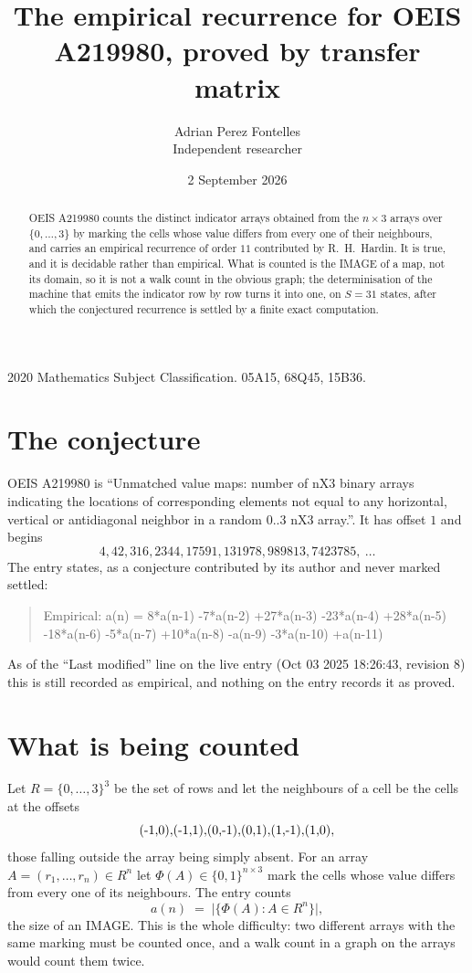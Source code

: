 \documentclass[11pt,a4paper]{article}
\title{The empirical recurrence for OEIS A219980, proved by transfer matrix}
\author{Adrian Perez Fontelles\\ \small Independent researcher}
\date{2 September 2026}
\theoremstyle{plain}
\theoremstyle{definition}
\begin{document}
\maketitle

\begin{abstract}
OEIS A219980 counts the distinct indicator arrays obtained from the $n\times3$ arrays over
$\{0,\dots,3\}$ by marking the cells whose value differs from every one of their neighbours, and carries an
empirical recurrence of order $11$ contributed by R.~H.~Hardin. It is true, and it is
decidable rather than empirical. What is counted is the IMAGE of a map, not its domain, so it
is not a walk count in the obvious graph; the determinisation of the machine that emits the
indicator row by row turns it into one, on $S=31$ states, after which the conjectured
recurrence is settled by a finite exact computation.
\end{abstract}

\noindent\small 2020 Mathematics Subject Classification. 05A15, 68Q45, 15B36.\normalsize

\section{The conjecture}

OEIS A219980 is ``Unmatched value maps: number of nX3 binary arrays indicating the locations of corresponding elements not equal to any horizontal, vertical or antidiagonal neighbor in a random 0..3 nX3 array.''. It has offset $1$ and begins
\[
4, 42, 316, 2344, 17591, 131978, 989813, 7423785,\ \dots
\]
The entry states, as a conjecture contributed by its author and never marked settled:
\begin{quote}
Empirical: a(n) = 8*a(n-1) -7*a(n-2) +27*a(n-3) -23*a(n-4) +28*a(n-5) -18*a(n-6) -5*a(n-7) +10*a(n-8) -a(n-9) -3*a(n-10) +a(n-11)
\end{quote}
As of the ``Last modified'' line on the live entry (Oct 03 2025 18:26:43, revision 8) this is still
recorded as empirical, and nothing on the entry records it as proved.

\section{What is being counted}

Let $R=\{0,\dots,3\}^{3}$ be the set of rows and let the neighbours of a cell be the
cells at the offsets
\[
$(-1,0)$, $(-1,1)$, $(0,-1)$, $(0,1)$, $(1,-1)$, $(1,0)$,
\]
those falling outside the array being simply absent. For an array
$A=(r_1,\dots,r_n)\in R^n$ let $\Phi(A)\in\{0,1\}^{n\times3}$ mark the cells whose value
differs from every one of its neighbours. The entry counts
\[
a(n)\;=\;\bigl|\{\Phi(A):A\in R^n\}\bigr| ,
\]
the size of an IMAGE. This is the whole difficulty: two different arrays with the same marking
must be counted once, and a walk count in a graph on the arrays would count them twice.
\end{document}
